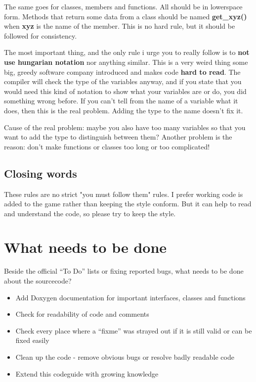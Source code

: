 \documentclass[english,a4paper,12pt]{report}
\begin{document}
    The same goes for classes, members and functions. All should be in
    lowerspace form. Methods that return some data from a class should
    be named \textbf{get\_xyz()} when \textbf{xyz} is the name of the
    member. This is no hard rule, but it should be followed for
    consistency.
    
    The most important thing, and the only rule i urge you to really
    follow is to \textbf{not use hungarian notation} nor anything
    similar. This is a very weird thing some big, greedy software
    company introduced and makes code \textbf{hard to read}. The
    compiler will check the type of the variables anyway, and if you
    state that you would need this kind of notation to show what your
    variables are or do, you did something wrong before. If you can't
    tell from the name of a variable what it does, then this is the real
    problem. Adding the type to the name doesn't fix it.

    Cause of the real problem: maybe you also have too many variables so
    that you want to add the type to distinguish between them? Another
    problem is the reason: don't make functions or classes too long or
    too complicated!
    

    \section{Closing words}

      These rules are no strict "you must follow them" rules. I prefer
      working code is added to the game rather than keeping the style
      conform. But it can help to read and understand the code, so
      please try to keep the style.
    
    \chapter{What needs to be done}

    Beside the official ``To Do'' lists or fixing reported bugs, what
    needs to be done about the sourcecode?

    \begin{itemize}
    \item Add Doxygen documentation for important interfaces, classes
      and functions
    \item Check for readability of code and comments
    \item Check every place where a ``fixme'' was strayed out if it is
      still valid or can be fixed easily
    \item Clean up the code - remove obvious bugs or resolve badly
      readable code
    \item Extend this codeguide with growing knowledge
    \end{itemize}
\end{document}
